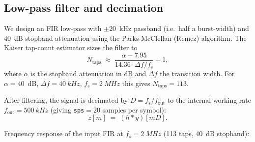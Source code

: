 \documentclass[11pt,a4paper]{article}
\begin{document}
\subsection{Low-pass filter and decimation}

We design an FIR low-pass with $\pm 20$~kHz passband (i.e.\ half a
burst-width) and \SI{40}{dB} stopband attenuation using the Parks-McClellan
(Remez) algorithm. The Kaiser tap-count estimator sizes the filter to
\begin{equation}
N_\text{taps} \;\approx\; \frac{\alpha - 7.95}{14.36 \cdot \Delta f / f_s} + 1,
\end{equation}
where $\alpha$ is the stopband attenuation in dB and $\Delta f$ the
transition width. For $\alpha = 40$~dB, $\Delta f = \SI{40}{kHz}$,
$f_s = \SI{2}{MHz}$ this gives $N_\text{taps} = 113$.

After filtering, the signal is decimated by
$D = f_s / f_\text{out}$ to the internal working rate
$f_\text{out} = \SI{500}{kHz}$ (giving \texttt{sps}$= 20$ samples per
symbol):
\begin{equation}
z[m] \;=\; (h * y)[m D].
\end{equation}

Frequency response of the input FIR at $f_s = \SI{2}{MHz}$ (113 taps,
40~dB stopband):
\end{document}
